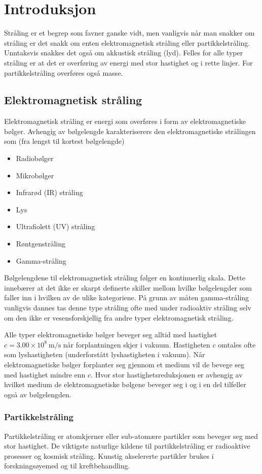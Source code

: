 \documentclass[a4paper,norsk,12pt]{book}
\begin{document}
\tableofcontents

\chapter{Introduksjon}
Stråling er et begrep som favner ganske vidt, men vanligvis når man snakker om stråling er det snakk om enten elektromagnetisk stråling eller partikkelstråling. Unntaksvis snakkes det også om akkustisk stråling (lyd). Felles for alle typer stråling er at det er overføring av energi med stor hastighet og i rette linjer. For partikkelstråling overføres også masse.

\section{Elektromagnetisk stråling}
Elektromagnetisk stråling er energi som overføres i form av elektromagnetiske bølger. Avhengig av bølgelengde karakteriserers den elektromagnetiske strålingen som (fra lengst til kortest bølgelengde)
\begin{itemize}
	\item Radiobølger
	\item Mikrobølger
	\item Infrarød (IR) stråling
	\item Lys
	\item Ultrafiolett (UV) stråling
	\item Røntgenstråling
	\item Gamma-stråling
\end{itemize}
Bølgelengdene til elektromagnetisk stråling følger en kontinuerlig skala. Dette innebærer at det ikke er skarpt definerte skiller mellom hvilke bølgelengder som faller inn i hvilken av de ulike kategoriene. På grunn av måten gamma-stråling vanligvis dannes tas denne type stråling ofte med under radioaktiv stråling selv om den ikke er vesensforskjellig fra andre typer elektromagnetisk stråling.

Alle typer elektromagnetiske bølger beveger seg alltid med hastighet $c = 3.00\times10^8~\mathrm{m/s}$ når forplantningen skjer i vakuum. Hastigheten $c$ omtales ofte som lyshastigheten (underforstått lyshastigheten i vakuum). Når elektromagnetiske bølger forplanter seg gjennom et medium vil de bevege seg med hastighet mindre enn $c$. Hvor stor hastighetsreduksjonen  er avhengig av hvilket medium de elektromagnetiske bølgene beveger seg i og i en del tilfeller også av bølgelengden.

\subsection{Partikkelstråling}
Partikkelstråling er atomkjerner eller sub-atomære partikler som beveger seg med stor hastighet. De viktigste naturlige kildene til partikkelstråling er radioaktive prosesser og kosmisk stråling. Kunstig akselererte partikler brukes i forskningsøyemed og til kreftbehandling.
\end{document}
